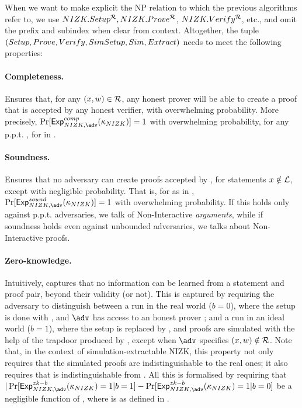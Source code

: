 When we want to make explicit the NP relation \NIZKRel to which the previous
algorithms refer to, we use $NIZK.Setup^\mathcal{R},NIZK.Prove^\mathcal{R}$, 
$NIZK.Verify^\mathcal{R}$, etc., and omit the \NIZK prefix and subindex when clear
from context. Altogether, the tuple $(Setup,Prove,Verify,SimSetup,Sim,
Extract)$ needs to meet the following properties:

\paragraph{Completeness.} %
Ensures that, for any $(x,w) \in \mathcal{R}$, any honest prover will be
able to create a proof \NIZKproof that is accepted by any honest verifier, with
overwhelming probability. More precisely, $\Pr\lbrack\ExpNIZKComp(\NIZKsecpar)
\rbrack = 1$ with overwhelming probability, for any p.p.t. \adv, for
\ExpNIZKComp in .

\paragraph{Soundness.} %
Ensures that no adversary can create proofs accepted by \Verify, for
statements $x \notin \mathcal{L}$, except with negligible probability. That
is, for \ExpNIZKSound as in , $\Pr\lbrack\ExpNIZKSound
(\NIZKsecpar)\rbrack=1$ with overwhelming probability. If this holds only
against p.p.t. adversaries, we talk of Non-Interactive \emph{arguments}, while
if soundness holds even against unbounded adversaries, we talks about
Non-Interactive proofs.

\paragraph{Zero-knowledge.} %
Intuitively, captures that no information can be learned from a statement and
proof pair, beyond their validity (or not). This is captured by requiring the
adversary to distinguish between a run in the real world ($b=0$), where the
setup is done with \Setup, and $\adv$ has access to an honest prover
\Prove; and a run in an ideal world ($b=1$), where the setup is replaced by
\SimSetup, and proofs are simulated with the help of the trapdoor produced by
\SimSetup, except when $\adv$ specifies $(x,w) \notin \mathcal{R}$. Note
that, in the context of simulation-extractable NIZK, this property not only
requires that the simulated proofs are indistinguishable to the real ones; it
also requires that \SimSetup is indistinguishable from \Setup. All this is
formalised by requiring that $|\Pr[\ExpNIZKZKb(\NIZKsecpar) = 1 | b = 1] -
\Pr[\ExpNIZKZKb(\NIZKsecpar) = 1 | b = 0]$ be a negligible function of \secpar,
where \ExpNIZKZKb is as defined in .

